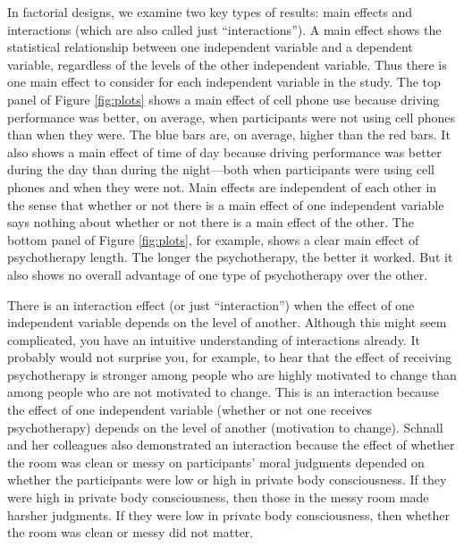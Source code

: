 \documentclass[
]{krantz}
\begin{document}
In factorial designs, we examine two key types of results: main effects and interactions (which are also called just ``interactions''). A main effect shows the statistical relationship between one independent variable and a dependent variable, regardless of the levels of the other independent variable. Thus there is one main effect to consider for each independent variable in the study. The top panel of Figure \ref{fig:plots} shows a main effect of cell phone use because driving performance was better, on average, when participants were not using cell phones than when they were. The blue bars are, on average, higher than the red bars. It also shows a main effect of time of day because driving performance was better during the day than during the night---both when participants were using cell phones and when they were not. Main effects are independent of each other in the sense that whether or not there is a main effect of one independent variable says nothing about whether or not there is a main effect of the other. The bottom panel of Figure \ref{fig:plots}, for example, shows a clear main effect of psychotherapy length. The longer the psychotherapy, the better it worked. But it also shows no overall advantage of one type of psychotherapy over the other.

There is an interaction effect (or just ``interaction'') when the effect of one independent variable depends on the level of another. Although this might seem complicated, you have an intuitive understanding of interactions already. It probably would not surprise you, for example, to hear that the effect of receiving psychotherapy is stronger among people who are highly motivated to change than among people who are not motivated to change. This is an interaction because the effect of one independent variable (whether or not one receives psychotherapy) depends on the level of another (motivation to change). Schnall and her colleagues also demonstrated an interaction because the effect of whether the room was clean or messy on participants' moral judgments depended on whether the participants were low or high in private body consciousness. If they were high in private body consciousness, then those in the messy room made harsher judgments. If they were low in private body consciousness, then whether the room was clean or messy did not matter.
\end{document}

